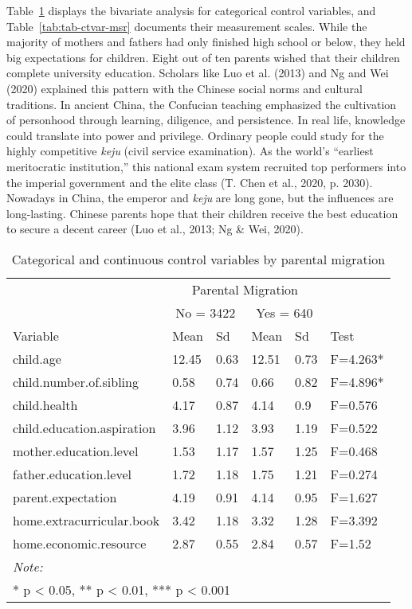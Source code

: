 \documentclass[
  man,floatsintext]{apa7}
\begin{document}
\newpage

Table~\ref{tab:tab-ctvar-cnt} displays the bivariate analysis for categorical control variables, and Table~\ref{tab:tab-ctvar-msr} documents their measurement scales. While the majority of mothers and fathers had only finished high school or below, they held big expectations for children. Eight out of ten parents wished that their children complete university education. Scholars like Luo et al. (2013) and Ng and Wei (2020) explained this pattern with the Chinese social norms and cultural traditions. In ancient China, the Confucian teaching emphasized the cultivation of personhood through learning, diligence, and persistence. In real life, knowledge could translate into power and privilege. Ordinary people could study for the highly competitive \emph{keju} (civil service examination). As the world's ``earliest meritocratic institution,'' this national exam system recruited top performers into the imperial government and the elite class (T. Chen et al., 2020, p. 2030). Nowadays in China, the emperor and \emph{keju} are long gone, but the influences are long-lasting. Chinese parents hope that their children receive the best education to secure a decent career (Luo et al., 2013; Ng \& Wei, 2020).

\begin{table}

\caption{\label{tab:tab-ctvar-cnt}Categorical and continuous control variables by parental migration}
\centering
\begin{tabular}[t]{llllll}
\toprule
\multicolumn{1}{c}{ } & \multicolumn{4}{c}{Parental Migration} \\
\cmidrule(l{3pt}r{3pt}){2-5}
\multicolumn{1}{c}{ } & \multicolumn{2}{c}{No = 3422} & \multicolumn{2}{c}{Yes = 640} \\
\cmidrule(l{3pt}r{3pt}){2-3} \cmidrule(l{3pt}r{3pt}){4-5}
Variable & Mean & Sd & Mean & Sd & Test\\
\midrule
child.age & 12.45 & 0.63 & 12.51 & 0.73 & F=4.263*\\
child.number.of.sibling & 0.58 & 0.74 & 0.66 & 0.82 & F=4.896*\\
child.health & 4.17 & 0.87 & 4.14 & 0.9 & F=0.576\\
child.education.aspiration & 3.96 & 1.12 & 3.93 & 1.19 & F=0.522\\
mother.education.level & 1.53 & 1.17 & 1.57 & 1.25 & F=0.468\\
\addlinespace
father.education.level & 1.72 & 1.18 & 1.75 & 1.21 & F=0.274\\
parent.expectation & 4.19 & 0.91 & 4.14 & 0.95 & F=1.627\\
home.extracurricular.book & 3.42 & 1.18 & 3.32 & 1.28 & F=3.392\\
home.economic.resource & 2.87 & 0.55 & 2.84 & 0.57 & F=1.52\\
\bottomrule
\multicolumn{6}{l}{\rule{0pt}{1em}\textit{Note: }}\\
\multicolumn{6}{l}{\rule{0pt}{1em}* p < 0.05, ** p < 0.01, *** p < 0.001}\\
\end{tabular}
\end{table}
\end{document}
